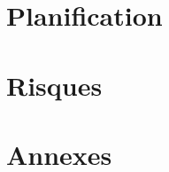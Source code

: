 \documentclass[11pt]{article}
\begin{document}
\section{Planification} %
\label{sec:Planification}

\section{Risques} %
\label{sec:Risques}



%
%
%



\section*{Annexes}
\begin{appendices}



\end{appendices}
\end{document}
